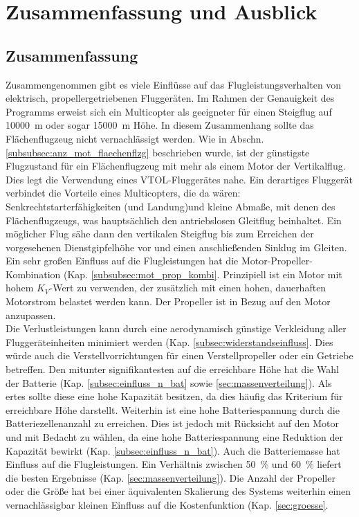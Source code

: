 \chapter{Zusammenfassung und Ausblick}

\section{Zusammenfassung}
Zusammengenommen gibt es viele Einflüsse auf das Flugleistungsverhalten von elektrisch, propellergetriebenen Fluggeräten. 
Im Rahmen der Genauigkeit des Programms erweist sich ein Multicopter als geeigneter für einen Steigflug auf \SI{10000}{m} oder sogar \SI{15000}{m} Höhe. In diesem Zusammenhang sollte das Flächenflugzeug nicht vernachlässigt werden. Wie in Abschn. \ref{subsubsec:anz_mot_flaechenflzg} beschrieben wurde, ist der günstigste Flugzustand für ein Flächenflugzeug mit mehr als einem Motor der Vertikalflug. Dies legt die Verwendung eines VTOL-Fluggerätes nahe. Ein derartiges Fluggerät verbindet die Vorteile eines Multicopters, die da wären: Senkrechtstarterfähigkeiten (und Landung)und kleine Abmaße, mit denen des Flächenflugzeugs, was hauptsächlich den antriebslosen Gleitflug beinhaltet. Ein möglicher Flug sähe dann den vertikalen Steigflug bis zum Erreichen der vorgesehenen Dienstgipfelhöhe vor und einen anschließenden Sinklug im Gleiten. \\
Ein sehr großen Einfluss auf die Flugleistungen hat die Motor-Propeller-Kombination (Kap. \ref{subsubsec:mot_prop_kombi}. Prinzipiell ist ein Motor mit hohem \ensuremath{K_V}-Wert zu verwenden, der zusätzlich mit einen hohen, dauerhaften Motorstrom belastet werden kann. Der Propeller ist in Bezug auf den Motor anzupassen. \\
Die Verlustleistungen kann durch eine aerodynamisch günstige Verkleidung aller Fluggeräteinheiten minimiert werden (Kap. \ref{subsec:widerstandseinfluss}. Dies würde auch die Verstellvorrichtungen für einen Verstellpropeller oder ein Getriebe betreffen. Den mitunter signifikantesten auf die erreichbare Höhe hat die Wahl der Batterie (Kap. \ref{subsec:einfluss_n_bat} sowie \ref{sec:massenverteilung}). Als ertes sollte diese eine hohe Kapazität besitzen, da dies häufig das Kriterium für erreichbare Höhe darstellt. Weiterhin ist eine hohe Batteriespannung durch die Batteriezellenanzahl zu erreichen. Dies ist jedoch mit Rücksicht auf den Motor und mit Bedacht zu wählen, da eine hohe Batteriespannung eine Reduktion der Kapazität bewirkt (Kap. \ref{subsec:einfluss_n_bat}). Auch die Batteriemasse hat Einfluss auf die Flugleistungen. Ein Verhältnis zwischen \SI{50}{\%} und \SI{60}{\%} liefert die besten Ergebnisse (Kap. \ref{sec:massenverteilung}). Die Anzahl der Propeller oder die Größe hat bei einer äquivalenten Skalierung des Systems weiterhin einen vernachlässigbar kleinen Einfluss auf die Kostenfunktion (Kap. \ref{sec:groesse}. \\
